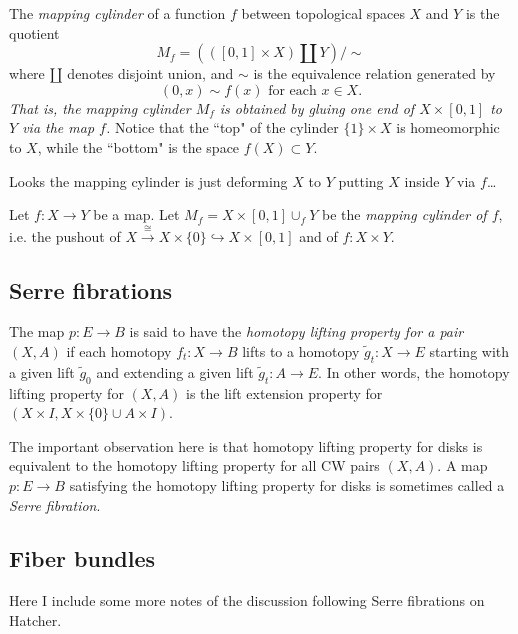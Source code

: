 \begin{definition}
The {\it mapping cylinder} of a function $f$ between topological spaces $X$ and $Y$ is the quotient
$$M_f=(([0,1]\times X)\amalg Y)\big/\sim$$
where $\amalg$ denotes disjoint union, and $\sim$ is the equivalence relation generated by
$$(0,x)\sim f(x)\text{ for each }x\in X.$$
{\it That is, the mapping cylinder $M_f$ is obtained by gluing one end of $X\times[0,1]$ to $Y$ via the map $f$.} Notice that the ``top" of the cylinder $\{1\}\times X$ is homeomorphic to $X$, while the ``bottom" is the space $f(X)\subset Y$.
	
{\color{persiangreen}Looks the mapping cylinder is just deforming $X$ to $Y$ putting $X$ inside $Y$ via $f$…}
\end{definition}

\begin{definition}
	Let $f:X\to Y$ be a map. Let $M_f=X\times[0,1]\cup_fY$ be the {\it mapping cylinder of $f$}, i.e. the pushout of $X\overset{\cong}{\to}X\times\{0\}\hookrightarrow X\times[0,1]$ and of $f:X\times Y$.
\end{definition}

\subsection{Serre fibrations}

\begin{definition}[Hatcher, p. 376]
		The map $p:E\to B$ is said to have the {\it homotopy lifting property for a pair} $(X,A)$ if each homotopy $f_t:X\to B$ lifts to a homotopy $\tilde{g}_t:X\to E$ starting with a given lift $\tilde{g}_0$ and extending a given lift $\tilde{g}_t:A\to E$. In other words, the homotopy lifting property for $(X,A)$ is the lift extension property for $(X\times I,X\times\{0\}\cup A\times I)$.
	
	The important observation here is that homotopy lifting property for disks is equivalent to the homotopy lifting property for all CW pairs $(X,A)$. A map $p:E\to B$ satisfying the homotopy lifting property for disks is sometimes called a {\it Serre fibration}.
\end{definition}

\subsection{Fiber bundles}

Here I include some more notes of the discussion following Serre fibrations on Hatcher.

